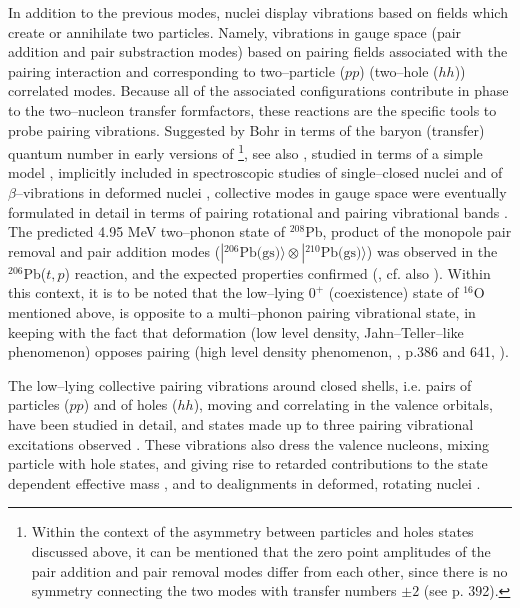 \documentclass[a4paper,11pt]{article}
\numberwithin{equation}{section}
\numberwithin{figure}{section}
\numberwithin{table}{section}
\newcommand{\ket}[1]{|{#1} \rangle }
\begin{document}
In addition to the previous modes, nuclei display vibrations based on fields which create or annihilate two particles. Namely, vibrations in gauge space (pair addition and pair substraction modes) based on pairing fields associated with the pairing interaction and corresponding to two--particle ($pp$) (two--hole ($hh$)) correlated modes. Because  all of the associated configurations contribute in phase to the two--nucleon transfer formfactors, these reactions are the specific tools to probe pairing vibrations. Suggested by Bohr in terms of the baryon (transfer) quantum number in early versions of \cite{Bohr:75}\footnote{Within the context of the asymmetry between particles and holes states discussed above, it can be mentioned that the zero point amplitudes of the pair addition and pair removal modes differ from each other, since there is no symmetry connecting the two modes with transfer numbers $\pm 2$ (see \cite{Bohr:75} p. 392).}, see also \cite{Bohr:64}, studied in terms of a simple model \cite{Hogassen:61}, implicitly included in spectroscopic studies of single--closed nuclei \cite{Arvieu:63} and of $\beta$--vibrations in deformed nuclei \cite{Bes:63}, collective modes in gauge space were eventually formulated in detail in terms of pairing rotational and pairing vibrational bands \cite{Bes:66}. The predicted 4.95 MeV two--phonon state of $^{208}$Pb, product of the monopole pair removal and pair addition modes ($\ket{^{206}\text{Pb(gs)}}\otimes \ket{^{210}\text{Pb(gs)}}$) was observed in the $^{206}$Pb($t,p$) reaction, and the expected properties confirmed (\cite{Bjerregaard:66b,Broglia:67}, cf. also \cite{Mottelson:76}). Within this context, it is to be noted that the low--lying $0^+$ (coexistence) state of $^{16}$O mentioned above, is opposite to a multi--phonon pairing vibrational state, in keeping with the fact that deformation (low level density, Jahn--Teller--like phenomenon) opposes pairing (high level density phenomenon, \cite{Bohr:75}, p.386 and 641, \cite{Mottelson:76}).


The low--lying collective pairing vibrations around closed shells, i.e. pairs of particles ($pp$) and of holes ($hh$), moving and correlating in the valence orbitals, have been studied in detail, and states made up to three pairing vibrational excitations observed \cite{Flynn:72,Broglia:73}.
These vibrations also dress the valence nucleons, mixing particle with hole states, and giving rise to retarded contributions to the state dependent effective mass   \cite{Bes:71,Flynn:71,Bes:71d,Broglia:74,Perazzo:80}, and to dealignments in deformed, rotating nuclei \cite{Barranco:87b,Shimizu:89}.
\end{document}
